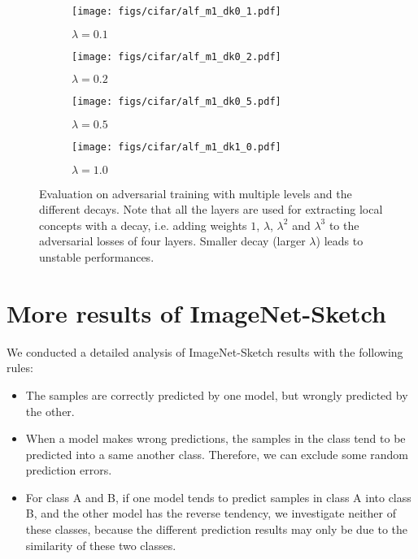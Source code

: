 \documentclass{article}
\begin{document}
\begin{figure}[h!]
  \centering
    \begin{subfigure}{.49\textwidth}
      \centering
      \texttt{[image: figs/cifar/alf\_m1\_dk0\_1.pdf]}
      \caption{$\lambda=0.1$}
      \label{process}
    \end{subfigure}
    \begin{subfigure}{.49\textwidth}
      \centering
      \texttt{[image: figs/cifar/alf\_m1\_dk0\_2.pdf]}
      \caption{$\lambda=0.2$}
    \end{subfigure}
    \begin{subfigure}{.49\textwidth}
      \centering
      \texttt{[image: figs/cifar/alf\_m1\_dk0\_5.pdf]}
      \caption{$\lambda=0.5$}
    \end{subfigure}
    \begin{subfigure}{.49\textwidth}
      \centering
      \texttt{[image: figs/cifar/alf\_m1\_dk1\_0.pdf]}
      \caption{$\lambda=1.0$}
    \end{subfigure}
\caption{Evaluation on adversarial training with multiple levels and the different decays. Note that all the layers are used for extracting local concepts with a decay, i.e. adding weights $1$, $\lambda$, $\lambda^2$ and $\lambda^3$ to the adversarial losses of four layers. Smaller decay (larger $\lambda$) leads to unstable performances.}
\label{fig:multilayer}
\end{figure}

\newpage 

\section{More results of ImageNet-Sketch}
\label{sec:appendix:sketch}

We conducted a detailed analysis of ImageNet-Sketch results with the following rules: 
\begin{itemize}
    \item The samples are correctly predicted by one model, but wrongly predicted by the other. 
    \item When a model makes wrong predictions, the samples in the class tend to be predicted into a same another class. Therefore, we can exclude some random prediction errors. 
    \item For class A and B, if one model tends to predict samples in class A into class B, and the other model has the reverse tendency, we investigate neither of these classes, because the different prediction results may only be due to the similarity of these two classes. 
\end{itemize}
\end{document}
